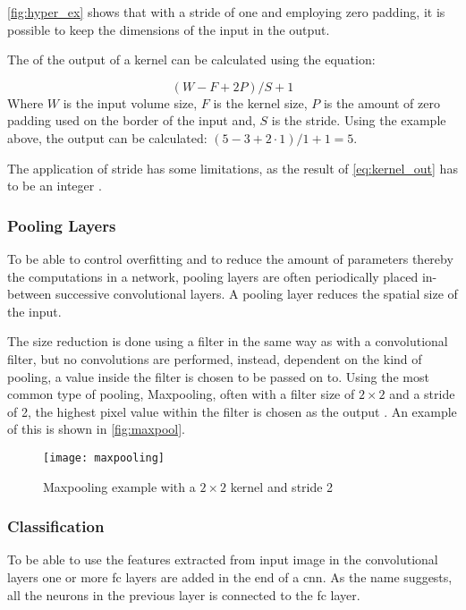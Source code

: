 \autoref{fig:hyper_ex} shows that with a stride of one and employing zero padding, it is possible to keep the dimensions of the input in the output.

The of the output of a kernel can be calculated using the equation:

\begin{equation}\label{eq:kernel_out}
	(W-F+2P)/S+1
\end{equation}
Where $ W $ is the input volume size, $F$ is the kernel size, $P$ is the amount of zero padding used on the border of the input and, $S$ is the stride. Using the example above, the output can be calculated: $(5-3+2\cdot1)/1+1=5$.

The application of stride has some limitations, as the result of \autoref{eq:kernel_out} has to be an integer \citep{Karpathy2016b}.\\

\subsubsection{Pooling Layers}
To be able to control overfitting and to reduce the amount of parameters thereby the computations in a network, pooling layers are often periodically placed in-between successive convolutional layers. A pooling layer reduces the spatial size of the input.

The size reduction is done using a filter in the same way as with a convolutional filter, but no convolutions are performed, instead, dependent on the kind of pooling, a value inside the filter is chosen to be passed on to. Using the most common type of pooling, Maxpooling, often with a filter size of $2\times2$ and a stride of 2, the highest pixel value within the filter is chosen as the output \citep{Karpathy2016b}. An example of this is shown in \autoref{fig:maxpool}.

\begin{figure}[H]
	\centering
	\texttt{[image: maxpooling]}
	\caption{Maxpooling example with a $2\times2$ kernel and stride 2 \citep{Karpathy2016b}}
	\label{fig:maxpool}
\end{figure}

\subsubsection{Classification}
To be able to use the features extracted from input image in the convolutional layers one or more \gls{fc} layers are added in the end of a \gls{cnn}. As the name suggests, all the neurons in the previous layer is connected to the \gls{fc} layer.

